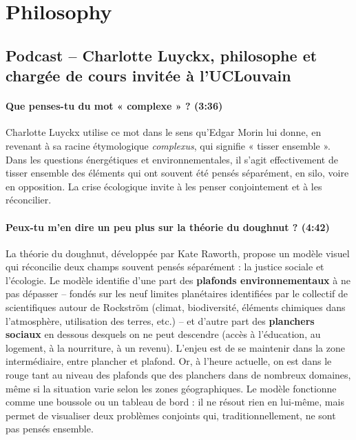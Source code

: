 \chapter{Philosophy}


\section{Podcast -- Charlotte Luyckx, philosophe et chargée de cours invitée à l'UCLouvain}

\subsubsection{Que penses-tu du mot « complexe » ? \textnormal{\small(3:36)}}

Charlotte Luyckx utilise ce mot dans le sens qu'Edgar Morin lui donne, en revenant à sa racine étymologique \textit{complexus}, qui signifie « tisser ensemble ». Dans les questions énergétiques et environnementales, il s'agit effectivement de tisser ensemble des éléments qui ont souvent été pensés séparément, en silo, voire en opposition. La crise écologique invite à les penser conjointement et à les réconcilier.

\subsubsection{Peux-tu m'en dire un peu plus sur la théorie du doughnut ? \textnormal{\small(4:42)}}

La théorie du doughnut, développée par Kate Raworth, propose un modèle visuel qui réconcilie deux champs souvent pensés séparément : la justice sociale et l'écologie. Le modèle identifie d'une part des \textbf{plafonds environnementaux} à ne pas dépasser -- fondés sur les neuf limites planétaires identifiées par le collectif de scientifiques autour de Rockström (climat, biodiversité, éléments chimiques dans l'atmosphère, utilisation des terres, etc.) -- et d'autre part des \textbf{planchers sociaux} en dessous desquels on ne peut descendre (accès à l'éducation, au logement, à la nourriture, à un revenu). L'enjeu est de se maintenir dans la zone intermédiaire, entre plancher et plafond. Or, à l'heure actuelle, on est dans le rouge tant au niveau des plafonds que des planchers dans de nombreux domaines, même si la situation varie selon les zones géographiques. Le modèle fonctionne comme une boussole ou un tableau de bord : il ne résout rien en lui-même, mais permet de visualiser deux problèmes conjoints qui, traditionnellement, ne sont pas pensés ensemble.

